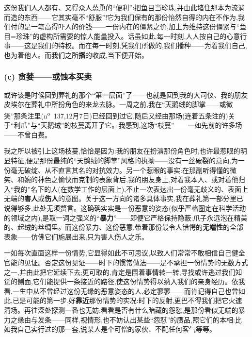 这份我们人人都有、又得众人怂恿的“便利”:把鱼目当珍珠,并由此堵住那本为流淌而造的东西——它其实毫不“舒服”!它为我们保有的那份怡然自得的内在不作为,我们付的是一笔高得吓人的价钱——一份内在的僵紧之价,加上为维持这份僵紧与“鱼目=珍珠”的虚构所需要的惊人能量投入。话虽如此,每一时刻,人人按自己的心意行事——这是我们的特权。而在每一\dmark{}时刻,凭我们所做的,我们播种——为着我们自己,也为着他人。而我们之所\textbf{播}的收成,当下便开始。

\subsubsection*{(c) 贪婪——或蚀本买卖}
\label{ch18:local:h56}

\label{ch18:local:n51}

或许该是时候回到葬礼的那个“第一层面”了——也就是回到我的大司仪、我的朋友皮埃尔在葬礼中所扮角色的来龙去脉。一周之前,我在“天鹅绒的脚掌——或微笑”那条注里(n\textsuperscript{o}~137,12月7日)已经回到过它,随后又经由那场(连着五条注的)关于“利爪”与“天鹅绒”的枝蔓离开了它。我感到,这场“枝蔓”——一如先前的许多场——不曾白费。

我之所以被引上这场枝蔓,恰恰是因为:我的朋友在扮演那份角色时,也许最惹眼的明显特征,便是那份最纯的“天鹅绒的脚掌”风格的执拗——没有一丝破裂的意向,为一份毫无破绽、从不直言其名的对抗效力。另一个惹眼的事实:在那副听得懂的微笑、和婉的神色之愉快而克制的表象背后,我的朋友身上,对着我本人、或对着他归入“我的”名下的人(在数学工作的层面上),不止一次表达出一份毫无歧义的、表面上无端的\textbf{害人}或\textbf{伤人}的意图。关于这一方向的诸多具体事实,我在葬礼第一部分里已说得够多,此处无须赘言。这确确实实是一份恶意的姿态(似乎严格圈定在科学活动的领域之内),是取一词之强义的“\textbf{暴力}”——即便它严格保持隐蔽:爪子永远泡在精美的、起绒的丝绸里。而这份暴力、这份恶意,带着那份最令人错愕的\textbf{无端性}的全部表象——仿佛它们施展出来,只为害人伤人之乐。

\dmark{}一如每次直面这样一份情势,它显得如此不可思议,以致人们常常不敢相信自己健全官能的见证。否定这份见证——时下的惯常做法——是不承担一份情势的无数方式之一,并由此把它延续下去;更可取的,肯定是围着事情转一转,寻找或许逃过我们知觉的侧面,它们能提供一条接近的路径,使这份情势得以纳入我们的亲身经历。依我看,一生中从不曾经过这份无缘的恶意姿态的人,必定寥寥——而肯记得自己也曾如此,已是可能的第一步,好\textbf{靠近}那份情势的实况:时下的反射,更巴不得我们把它火速清场。再往深处探测一番也无妨:看看是否有什么暗藏的怨怼,是那份看似无端的暴力之缘由与发条——同样,视情形,也不妨认出某些“怨怼”的赝品,照它们的本相:比如我自己实行过的那一套,说某人是个可憎的家伙、不配任何客气等等。

